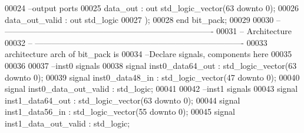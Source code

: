 \begin{DoxyCode}
00024 \textcolor{keyword}{        --output ports }
00025         \textcolor{vhdlchar}{data_out}        \textcolor{vhdlchar}{:} \textcolor{keywordflow}{out} \textcolor{comment}{std\_logic\_vector}\textcolor{vhdlchar}{(}\textcolor{vhdllogic}{}\textcolor{vhdllogic}{63} \textcolor{keywordflow}{downto} \textcolor{vhdllogic}{}\textcolor{vhdllogic}{0}\textcolor{vhdlchar}{)};
00026         \textcolor{vhdlchar}{data_out_valid}  \textcolor{vhdlchar}{:} \textcolor{keywordflow}{out} \textcolor{comment}{std\_logic}       
00027         \textcolor{vhdlchar}{)};
00028 \textcolor{keywordflow}{end} \textcolor{vhdlchar}{bit\_pack};
00029 
00030 \textcolor{keyword}{-- ----------------------------------------------------------------------------}
00031 \textcolor{keyword}{-- Architecture}
00032 \textcolor{keyword}{-- ----------------------------------------------------------------------------}
00033 \textcolor{keywordflow}{architecture} arch \textcolor{keywordflow}{of} bit_pack is
00034 \textcolor{keyword}{--Declare signals,  components here}
00035 
00036 
00037 \textcolor{keyword}{--inst0 signals}
00038 \textcolor{keywordflow}{signal} \textcolor{vhdlchar}{inst0_data64_out}       \textcolor{vhdlchar}{:} \textcolor{comment}{std\_logic\_vector}\textcolor{vhdlchar}{(}\textcolor{vhdllogic}{}\textcolor{vhdllogic}{63} \textcolor{keywordflow}{downto} \textcolor{vhdllogic}{}\textcolor{vhdllogic}{0}\textcolor{vhdlchar}{)};
00039 \textcolor{keywordflow}{signal} \textcolor{vhdlchar}{inst0_data48_in}        \textcolor{vhdlchar}{:} \textcolor{comment}{std\_logic\_vector}\textcolor{vhdlchar}{(}\textcolor{vhdllogic}{}\textcolor{vhdllogic}{47} \textcolor{keywordflow}{downto} \textcolor{vhdllogic}{}\textcolor{vhdllogic}{0}\textcolor{vhdlchar}{)};
00040 \textcolor{keywordflow}{signal} \textcolor{vhdlchar}{inst0_data_out_valid}   \textcolor{vhdlchar}{:} \textcolor{comment}{std\_logic};
00041 
00042 \textcolor{keyword}{--inst1 signals}
00043 \textcolor{keywordflow}{signal} \textcolor{vhdlchar}{inst1_data64_out}       \textcolor{vhdlchar}{:} \textcolor{comment}{std\_logic\_vector}\textcolor{vhdlchar}{(}\textcolor{vhdllogic}{}\textcolor{vhdllogic}{63} \textcolor{keywordflow}{downto} \textcolor{vhdllogic}{}\textcolor{vhdllogic}{0}\textcolor{vhdlchar}{)};
00044 \textcolor{keywordflow}{signal} \textcolor{vhdlchar}{inst1_data56_in}        \textcolor{vhdlchar}{:} \textcolor{comment}{std\_logic\_vector}\textcolor{vhdlchar}{(}\textcolor{vhdllogic}{}\textcolor{vhdllogic}{55} \textcolor{keywordflow}{downto} \textcolor{vhdllogic}{}\textcolor{vhdllogic}{0}\textcolor{vhdlchar}{)};
00045 \textcolor{keywordflow}{signal} \textcolor{vhdlchar}{inst1_data_out_valid}   \textcolor{vhdlchar}{:} \textcolor{comment}{std\_logic};

\end{DoxyCode}
